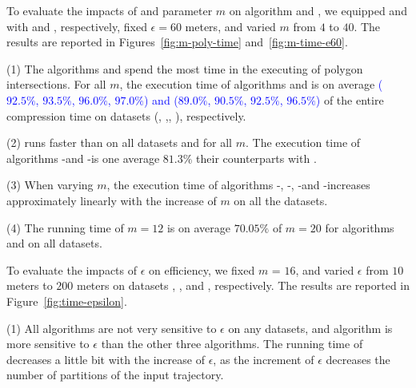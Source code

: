 To evaluate the impacts of \rpia and parameter $m$ on algorithm \cist and \cista, we
equipped \cist and \cista with \rpia and \cpia, respectively, fixed $\epsilon =60$ meters, and varied $m$ from $4$ to $40$.
%
The results are reported in Figures~\ref{fig:m-poly-time} and~\ref{fig:m-time-e60}.

\ni(1) The algorithms \cist and \cista spend the most time in the executing of
polygon intersections. For all $m$, the execution time of algorithms \cpia and
\rpia is on average \textcolor{blue}{($92.5\%$, $93.5\%$, $96.0\%$, $97.0\%$) and ($89.0\%$,
$90.5\%$, $92.5\%$, $96.5\%$)} of the entire compression  time on {datasets} (\sercar, \geolife,\mopsi,  \pricar), respectively.

\ni(2) \rpia runs faster than \cpia on all datasets and for all $m$. The execution time of algorithms \cist-\rpia and \cista-\rpia is one average $81.3\%$ their counterparts with \cpia.

\ni(3) When varying $m$, the execution time of algorithms \cist-\rpia, \cist-\cpia, \cista-\rpia and \cista-\cpia increases approximately linearly with the increase of $m$ on all the datasets.

\ni(4) The running time of $m=12$ is on average $70.05\%$ of $m=20$ for algorithms \cist and \cista on all datasets.




To evaluate the impacts of $\epsilon$ on efficiency, we fixed $m$ = $16$,
and varied $\epsilon$  from $10$ meters to $200$ meters on
{datasets}  \sercar, \geolife, \mopsi and \pricar, respectively.
The results are reported in Figure~\ref{fig:time-epsilon}.

\ni(1) All algorithms are not very sensitive to $\epsilon$ on any datasets, and algorithm \dps is more sensitive to $\epsilon$ than the other three algorithms.
The running time of \dps decreases a little bit with the increase of $\epsilon$, as the increment of $\epsilon$ decreases the number of partitions of the input trajectory.


